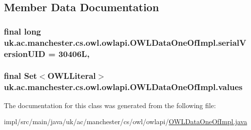 \subsection{Member Data Documentation}
\hypertarget{classuk_1_1ac_1_1manchester_1_1cs_1_1owl_1_1owlapi_1_1_o_w_l_data_one_of_impl_ae590c946c0ac5da3ebc72560e73ea667}{
\subsubsection[{serial\-Version\-U\-I\-D}]{\setlength{\rightskip}{0pt plus 5cm}final long uk.\-ac.\-manchester.\-cs.\-owl.\-owlapi.\-O\-W\-L\-Data\-One\-Of\-Impl.\-serial\-Version\-U\-I\-D = 30406\-L\hspace{0.3cm}{\ttfamily [static]}, {\ttfamily [private]}}}\label{classuk_1_1ac_1_1manchester_1_1cs_1_1owl_1_1owlapi_1_1_o_w_l_data_one_of_impl_ae590c946c0ac5da3ebc72560e73ea667}
\hypertarget{classuk_1_1ac_1_1manchester_1_1cs_1_1owl_1_1owlapi_1_1_o_w_l_data_one_of_impl_aba953817f70e2a98b28ab82ead8ea5db}{
\subsubsection[{values}]{\setlength{\rightskip}{0pt plus 5cm}final Set$<${\bf O\-W\-L\-Literal}$>$ uk.\-ac.\-manchester.\-cs.\-owl.\-owlapi.\-O\-W\-L\-Data\-One\-Of\-Impl.\-values\hspace{0.3cm}{\ttfamily [private]}}}\label{classuk_1_1ac_1_1manchester_1_1cs_1_1owl_1_1owlapi_1_1_o_w_l_data_one_of_impl_aba953817f70e2a98b28ab82ead8ea5db}


The documentation for this class was generated from the following file\-:\begin{DoxyCompactItemize}
\item 
impl/src/main/java/uk/ac/manchester/cs/owl/owlapi/\hyperlink{_o_w_l_data_one_of_impl_8java}{O\-W\-L\-Data\-One\-Of\-Impl.\-java}\end{DoxyCompactItemize}
